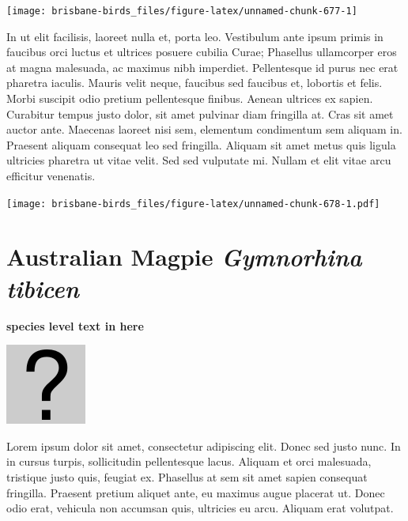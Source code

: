 \documentclass[]{book}
\let\origfigure\figure
\let\endorigfigure\endfigure
\renewenvironment{figure}[1][2] {
  \expandafter\origfigure\expandafter[H]
} {
  \endorigfigure
}
\begin{document}
\begin{figure}
\texttt{[image: brisbane-birds\_files/figure-latex/unnamed-chunk-677-1]} \caption{insert figure caption}\label{fig:unnamed-chunk-677}
\end{figure}

In ut elit facilisis, laoreet nulla et, porta leo. Vestibulum ante ipsum
primis in faucibus orci luctus et ultrices posuere cubilia Curae;
Phasellus ullamcorper eros at magna malesuada, ac maximus nibh
imperdiet. Pellentesque id purus nec erat pharetra iaculis. Mauris velit
neque, faucibus sed faucibus et, lobortis et felis. Morbi suscipit odio
pretium pellentesque finibus. Aenean ultrices ex sapien. Curabitur
tempus justo dolor, sit amet pulvinar diam fringilla at. Cras sit amet
auctor ante. Maecenas laoreet nisi sem, elementum condimentum sem
aliquam in. Praesent aliquam consequat leo sed fringilla. Aliquam sit
amet metus quis ligula ultricies pharetra ut vitae velit. Sed sed
vulputate mi. Nullam et elit vitae arcu efficitur venenatis.

\begin{figure}
\centering
\texttt{[image: brisbane-birds\_files/figure-latex/unnamed-chunk-678-1.pdf]}
\caption{\label{fig:unnamed-chunk-678}insert figure caption}
\end{figure}

\section{\texorpdfstring{Australian Magpie \emph{Gymnorhina
tibicen}}{Australian Magpie Gymnorhina tibicen}}\label{australian-magpie-gymnorhina-tibicen}

\textbf{species level text in here}

\begin{figure}
\centering
\includegraphics{assets/missing.png}
\caption{No image for species}
\end{figure}

Lorem ipsum dolor sit amet, consectetur adipiscing elit. Donec sed justo
nunc. In in cursus turpis, sollicitudin pellentesque lacus. Aliquam et
orci malesuada, tristique justo quis, feugiat ex. Phasellus at sem sit
amet sapien consequat fringilla. Praesent pretium aliquet ante, eu
maximus augue placerat ut. Donec odio erat, vehicula non accumsan quis,
ultricies eu arcu. Aliquam erat volutpat.
\end{document}
